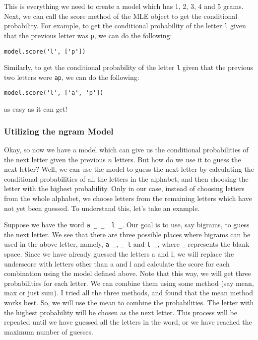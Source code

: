 \documentclass[12pt]{article}
\begin{document}
This is everything we need to create a model which has 1, 2, 3, 4 and 5 grams. Next, we can call the {\color{cyan}score} method of the {\color{cyan}MLE} object to get the conditional probability. For example, to get the conditional probability of the letter \verb|l| given that the previous letter was \verb|p|, we can do the following:

\begin{verbatim}
model.score('l', ['p'])
\end{verbatim}

Similarly, to get the conditional probability of the letter \verb|l| given that the previous two letters were \verb|ap|, we can do the following:

\begin{verbatim}
model.score('l', ['a', 'p'])
\end{verbatim}

as easy as it can get!

\subsubsection{Utilizing the ngram Model}
Okay, so now we have a model which can give us the conditional probabilities of the next letter given the previous $n$ letters. But how do we use it to guess the next letter? Well, we can use the model to guess the next letter by calculating the conditional probabilities of all the letters in the alphabet, and then choosing the letter with the highest probability. Only in our case, instead of choosing letters from the whole alphabet, we choose letters from the remaining letters which have not yet been guessed. To understand this, let's take an example.

Suppose we have the word \verb|a _ _  l _|. Our goal is to use, say bigrams, to guess the next letter. We see that there are three possible places where bigrams can be used in the above letter, namely, \verb|a _|, \verb|_ l| and \verb|l _|, where \verb|_| represents the blank space. Since we have already guessed the letters a and l, we will replace the underscore with letters other than a and l and calculate the score for each combination using the model defined above. Note that this way, we will get three probabilities for each letter. We can combine them using some method (say mean, max or just sum). I tried all the three methods, and found that the mean method works best. So, we will use the mean to combine the probabilities. The letter with the highest probability will be chosen as the next letter. This process will be repeated until we have guessed all the letters in the word, or we have reached the maximum number of guesses.
\end{document}
